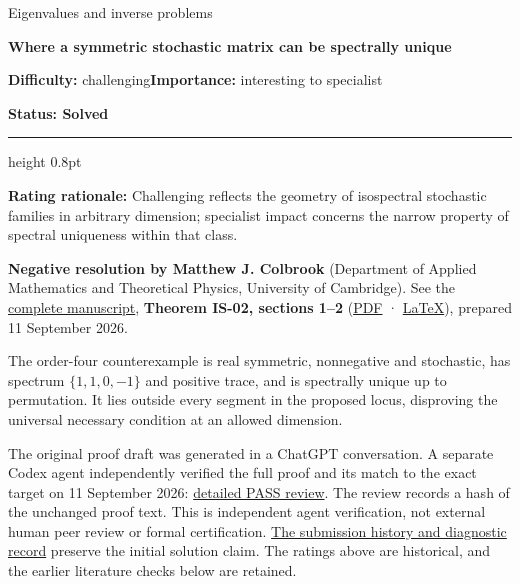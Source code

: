 \documentclass[11pt,a4paper]{article}
\makeatletter
\renewcommand{\subsection}{\Needspace{4\baselineskip}\@startsection{subsection}{2}{0pt}{9pt plus 1pt minus 1pt}{3pt}{\sffamily\bfseries\normalsize\color{ink}}}
\makeatother
\begin{document}
{\sffamily\small\color{muted}Eigenvalues and inverse problems\par}
\vspace{3pt}
{\raggedright{}\sffamily\bfseries\fontsize{21}{24}\selectfont\color{ink}Where
a symmetric stochastic matrix can be spectrally unique\par}
\vspace{7pt}
{\sffamily\small\textbf{Difficulty:} challenging\quad\textbf{Importance:} interesting
to specialist\par}
{\sffamily\small\bfseries\color{accent}Status: Solved\par}
\vspace{4pt}
{\color{accent}\hrule height 0.8pt}
\vspace{6pt}
\textbf{Rating rationale:} Challenging reflects the geometry of
isospectral stochastic families in arbitrary dimension; specialist
impact concerns the narrow property of spectral uniqueness within that
class.

\subsection{Resolution --- 2026-09-11}\label{resolution-2026-09-11}

\textbf{Negative resolution by Matthew J. Colbrook} (Department of
Applied Mathematics and Theoretical Physics, University of Cambridge).
See the
\href{https://github.com/ajt60gaibb/OpenProblemsInNLA/blob/main/eigenvalues-and-inverse-problems/IS-02/solution.md}{complete
manuscript}, \textbf{Theorem IS-02, sections 1--2}
(\href{https://github.com/ajt60gaibb/OpenProblemsInNLA/blob/main/eigenvalues-and-inverse-problems/IS-02/solution.pdf}{PDF}
·
\href{https://github.com/ajt60gaibb/OpenProblemsInNLA/blob/main/eigenvalues-and-inverse-problems/IS-02/solution.tex}{LaTeX}),
prepared 11 September 2026.

The order-four counterexample is real symmetric, nonnegative and
stochastic, has spectrum \(\{1,1,0,-1\}\) and positive trace, and is
spectrally unique up to permutation. It lies outside every segment in
the proposed locus, disproving the universal necessary condition at an
allowed dimension.

The original proof draft was generated in a ChatGPT conversation. A
separate Codex agent independently verified the full proof and its match
to the exact target on 11 September 2026:
\href{https://github.com/ajt60gaibb/OpenProblemsInNLA/blob/main/references/colbrook-2026-09-11/verification/reviews/IS-02-review.md}{detailed
PASS review}. The review records a hash of the unchanged proof text.
This is independent agent verification, not external human peer review
or formal certification.
\href{https://github.com/ajt60gaibb/OpenProblemsInNLA/blob/main/references/colbrook-2026-09-11/README.md}{The
submission history and diagnostic record} preserve the initial solution
claim. The ratings above are historical, and the earlier literature
checks below are retained.
\end{document}
